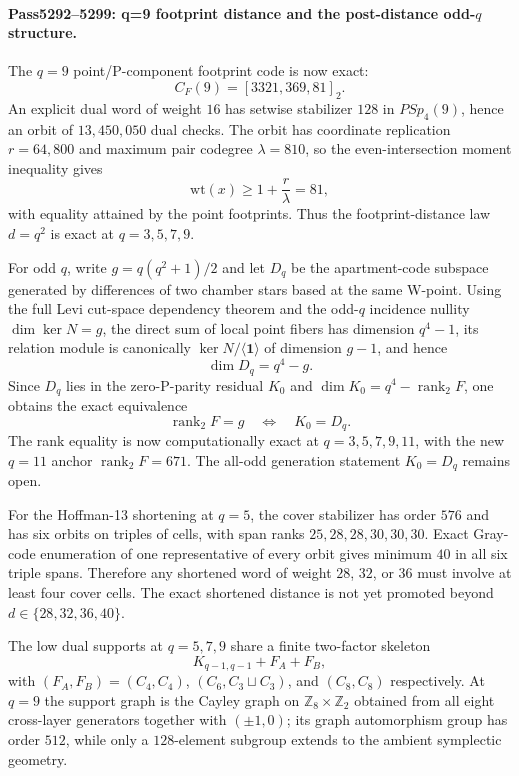 \paragraph{Pass5292--5299: q=9 footprint distance and the post-distance odd-$q$ structure.}
The $q=9$ point/P-component footprint code is now exact:
\[
 C_F(9)=[3321,369,81]_2.
\]
An explicit dual word of weight $16$ has setwise stabilizer $128$ in $PSp_4(9)$, hence an orbit of $13{,}450{,}050$ dual checks.  The orbit has coordinate replication $r=64{,}800$ and maximum pair codegree $\lambda=810$, so the even-intersection moment inequality gives
\[
 \mathrm{wt}(x)\ge 1+\frac r\lambda=81,
\]
with equality attained by the point footprints.  Thus the footprint-distance law $d=q^2$ is exact at $q=3,5,7,9$.

For odd $q$, write $g=q(q^2+1)/2$ and let $D_q$ be the apartment-code subspace generated by differences of two chamber stars based at the same W-point.  Using the full Levi cut-space dependency theorem and the odd-$q$ incidence nullity $\dim\ker N=g$, the direct sum of local point fibers has dimension $q^4-1$, its relation module is canonically $\ker N/\langle\mathbf 1\rangle$ of dimension $g-1$, and hence
\[
 \dim D_q=q^4-g.
\]
Since $D_q$ lies in the zero-P-parity residual $K_0$ and $\dim K_0=q^4-\operatorname{rank}_2F$, one obtains the exact equivalence
\[
 \operatorname{rank}_2F=g \quad\Longleftrightarrow\quad K_0=D_q.
\]
The rank equality is now computationally exact at $q=3,5,7,9,11$, with the new $q=11$ anchor $\operatorname{rank}_2F=671$.  The all-odd generation statement $K_0=D_q$ remains open.

For the Hoffman-13 shortening at $q=5$, the cover stabilizer has order $576$ and has six orbits on triples of cells, with span ranks $25,28,28,30,30,30$.  Exact Gray-code enumeration of one representative of every orbit gives minimum $40$ in all six triple spans.  Therefore any shortened word of weight $28$, $32$, or $36$ must involve at least four cover cells.  The exact shortened distance is not yet promoted beyond $d\in\{28,32,36,40\}$.

The low dual supports at $q=5,7,9$ share a finite two-factor skeleton
\[
 K_{q-1,q-1}+F_A+F_B,
\]
with $(F_A,F_B)=(C_4,C_4)$, $(C_6,C_3\sqcup C_3)$, and $(C_8,C_8)$ respectively.  At $q=9$ the support graph is the Cayley graph on $\mathbb Z_8\times\mathbb Z_2$ obtained from all eight cross-layer generators together with $(\pm1,0)$; its graph automorphism group has order $512$, while only a $128$-element subgroup extends to the ambient symplectic geometry.


